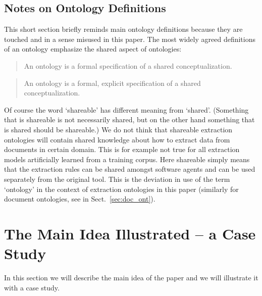 \subsection{Notes on Ontology Definitions}
This short section briefly reminds main ontology definitions because they are touched and in a sense misused in this paper. The most widely agreed definitions of an ontology emphasize the shared aspect of ontologies: 
\begin{quote}
An ontology is a formal specification of a shared conceptualization.	\citep{so17864}
\end{quote}

\begin{quote}
An ontology is a formal, explicit specification of a shared conceptualization. \citep{Studer1998161}
\end{quote}

Of course the word `shareable' has different meaning from `shared'. (Something that is shareable is not necessarily shared, but on the other hand something that is shared should be shareable.) We do not think that shareable extraction ontologies will contain shared knowledge about how to extract data from documents in certain domain. This is for example not true for all extraction models artificially learned from a training corpus. Here shareable simply means that the extraction rules can be shared amongst software agents and can be used separately from the original tool. This is the deviation in use of the term `ontology' in the context of extraction ontologies in this paper (similarly for document ontologies, see in Sect.~\ref{sec:doc_ont}).







\section{The Main Idea Illustrated -- a Case Study} \label{sec:case}

In this section we will describe the main idea of the paper and we will illustrate it with a case study.

